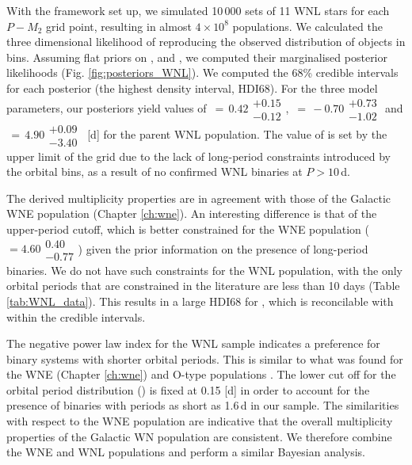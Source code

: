 With the framework set up, we simulated 10\,000 sets of 11 WNL stars for each $P-M_2$ grid point, resulting in almost $4 \times 10^8$ populations. We calculated the three dimensional likelihood of reproducing the observed distribution of objects in \DelRV{} bins. Assuming flat priors on \logPmaxWNL{}, \piWNL{} and \fintWNL{}, we computed their marginalised posterior likelihoods (Fig. \ref{fig:posteriors_WNL}). We computed the 68\% credible intervals for each posterior (the highest density interval, HDI68). For the three model parameters, our posteriors yield values of \fintWNL{}$\,=\,0.42\substack{+0.15 \\ -0.12}$, \piWNL{}$\,=\,-0.70\substack{+0.73 \\ -1.02}$ and \logPmaxWNL$\,=\,4.90\substack{+0.09 \\ -3.40}\,$ [d] for the parent WNL population. The value of \logPmaxWNL{} is set by the upper limit of the grid due to the lack of long-period constraints introduced by the orbital bins, as a result of no confirmed WNL binaries at $P>10\,$d. 

The derived multiplicity properties are in agreement with those of the Galactic WNE population (Chapter \ref{ch:wne}). An interesting difference is that of the upper-period cutoff, which is better constrained for the WNE population (\logPmaxWNE{}\,$= 4.60\substack{0.40 \\ -0.77}$) given the prior information on the presence of long-period binaries. We do not have such constraints for the WNL population, with the only orbital periods that are constrained in the literature are less than 10 days (Table \ref{tab:WNL_data}). This results in a large HDI68 for \logPmaxWNL{}, which is reconcilable with \logPmaxWNE{} within the credible intervals. 

The negative power law index for the WNL sample indicates a preference for binary systems with shorter orbital periods. This is similar to what was found for the WNE (Chapter \ref{ch:wne}) and O-type populations \citep{sana_binary_2012}. The lower cut off for the orbital period distribution (\logPminWNL{}) is fixed at 0.15 [d] in order to account for the presence of binaries with periods as short as 1.6\,d in our sample. The similarities with respect to the WNE population are indicative that the overall multiplicity properties of the Galactic WN population are consistent. We therefore combine the WNE and WNL populations and perform a similar Bayesian analysis. 


